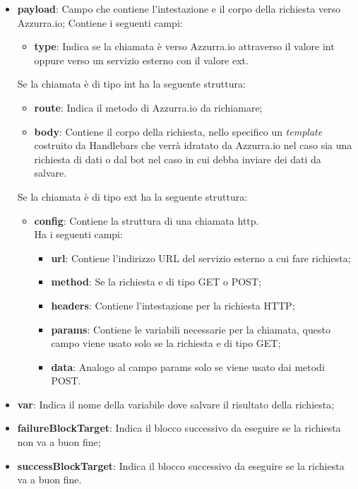 \begin{itemize}
	\item \textbf{payload}: Campo che contiene l'intestazione e il corpo della richiesta verso Azzurra.io;
	Contiene i seguenti campi:
	\begin{itemize}
		\item \textbf{type}: Indica se la chiamata è verso Azzurra.io attraverso il valore \textsf{int} oppure verso un servizio esterno con il valore \textsf{ext}.
	\end{itemize}
	Se la chiamata è di tipo int ha la seguente struttura:
	\begin{itemize}
		\item \textbf{route}: Indica il metodo di Azzurra.io da richiamare;
		\item \textbf{body}: Contiene il corpo della richiesta, nello specifico un \emph{template} costruito da Handlebars che verrà idratato da Azzurra.io nel caso sia una richiesta di dati o dal \gls{bot}\ap{[g]} nel caso in cui debba inviare dei dati da salvare.
	\end{itemize}
	Se la chiamata è di tipo ext ha la seguente struttura:
	\begin{itemize}
		\item \textbf{config}: Contiene la struttura di una chiamata \gls{http}\ap{[g]}.\\
		Ha i seguenti campi:
		\begin{itemize}
			\item \textbf{url}: Contiene l'indirizzo URL del servizio esterno a cui fare richiesta;
			\item \textbf{method}: Se la richiesta e di tipo GET o POST;
			\item \textbf{headers}: Contiene l'intestazione per la richiesta HTTP;
			\item \textbf{params}: Contiene le variabili necessarie per la chiamata, questo campo viene usato solo se la richiesta e di tipo GET;
			\item \textbf{data}: Analogo al campo params solo se viene usato dai metodi POST.
		\end{itemize}
	\end{itemize}
	\item \textbf{var}: Indica il nome della variabile dove salvare il risultato della richiesta;
	\item \textbf{failureBlockTarget}: Indica il blocco successivo da eseguire se la richiesta non va a buon fine;
	\item \textbf{successBlockTarget}: Indica il blocco successivo da eseguire se la richiesta va a buon fine.
\end{itemize}

